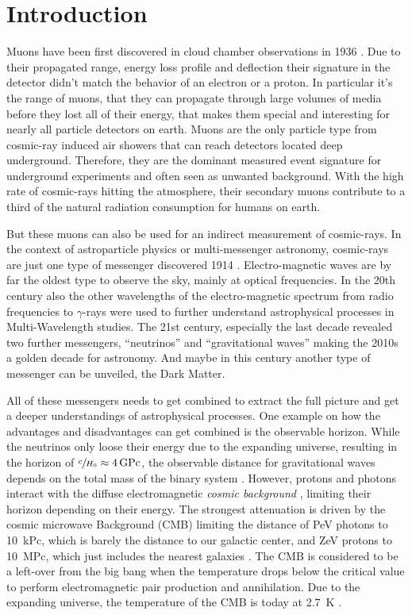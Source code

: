 \chapter{Introduction}

Muons have been first discovered in cloud chamber observations in 1936 \cite{Anderson36Muon}.
Due to their propagated range, energy loss profile and deflection their signature in the detector didn't match the behavior of an electron or a proton.
In particular it's the range of muons, that they can propagate through large volumes of media before they lost all of their energy, that makes them special and interesting for nearly all particle detectors on earth.
Muons are the only particle type from cosmic-ray induced air showers that can reach detectors located deep underground.
Therefore, they are the dominant measured event signature for underground experiments and often seen as unwanted background.
With the high rate of cosmic-rays hitting the atmosphere, their secondary muons contribute to a third of the natural radiation consumption for humans on earth.

But these muons can also be used for an indirect measurement of cosmic-rays.
In the context of astroparticle physics or multi-messenger astronomy, cosmic-rays are just one type of messenger discovered 1914 \cite{Hess12CRbirth}.
Electro-magnetic waves are by far the oldest type to observe the sky, mainly at optical frequencies.
In the 20th century also the other wavelengths of the electro-magnetic spectrum from radio frequencies to $\gamma$-rays were used to further understand astrophysical processes in Multi-Wavelength studies.
The 21st century, especially the last decade revealed two further messengers, \enquote{neutrinos} and \enquote{gravitational waves} making the 2010s a golden decade for astronomy.
And maybe in this century another type of messenger can be unveiled, the Dark Matter.

All of these messengers needs to get combined to extract the full picture and get a deeper understandings of astrophysical processes.
One example on how the advantages and disadvantages can get combined is the observable horizon.
While the neutrinos only loose their energy due to the expanding universe, resulting in the horizon of $\sfrac{c}{H_0}\approx\SI{4}{GPc}$, the observable distance for gravitational waves depends on the total mass of the binary system \cite{LIGO20WhitePaper}.
However, protons and photons interact with the diffuse electromagnetic \textit{cosmic background} \cite{Hill18CosmicBg}, limiting their horizon depending on their energy.
The strongest attenuation is driven by the cosmic microwave Background (CMB) limiting the distance of PeV photons to \SI{10}{kPc}, which is barely the distance to our galactic center, and ZeV protons to \SI{10}{MPc}, which just includes the nearest galaxies \cite{DeAngelis13Horizon}.
The CMB is considered to be a left-over from the big bang when the temperature drops below the critical value to perform electromagnetic pair production and annihilation.
Due to the expanding universe, the temperature of the CMB is today at \SI{2.7}{K} \cite{PDG20}.

